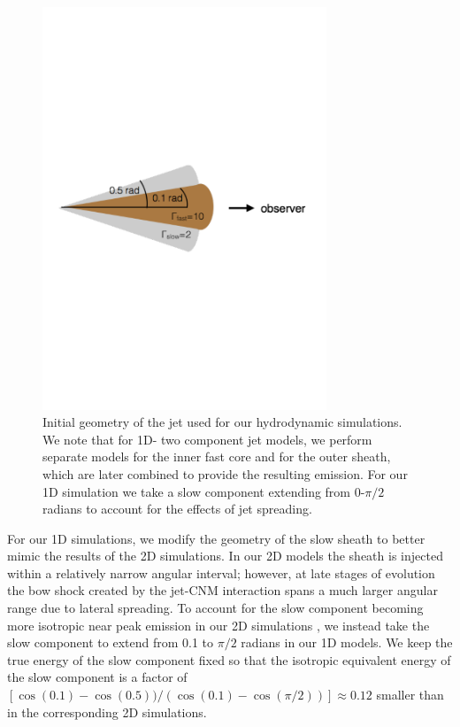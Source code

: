 \documentclass[usenatbib,fleqn]{mnras}
\begin{document}
\begin{figure}

\includegraphics[width=8.5cm]{jetstruct.pdf}
\caption{\label{fig:jetstruct} Initial geometry of the jet used for
  our hydrodynamic simulations. We note that for 1D- two component jet
  models, we perform separate models for the inner fast core and for
  the outer sheath, which are later combined to provide the resulting
  emission. For our 1D simulation we take a slow component
  extending from 0-$\pi/2$ radians to account for the effects of jet
  spreading.}
\end{figure}

For our 1D simulations, we modify the geometry of the slow sheath to
better mimic the results of the 2D simulations.  In our 2D models the
sheath is injected within a relatively narrow angular interval;
however, at late stages of evolution the bow shock created by the
jet-CNM interaction spans a much larger angular range due to lateral
spreading.  To account for the slow component becoming more isotropic
near peak emission in our 2D simulations \citep[bottom two panels of
Fig.~8 in][]{Mimica+2015}, we instead take the slow component to
extend from 0.1 to $\pi/2$ radians in our 1D models.  We keep the true
energy of the slow component fixed so that the isotropic equivalent
energy of the slow component is a factor of
$[\cos(0.1)-\cos(0.5))/(\cos(0.1)-\cos(\pi/2))]\approx 0.12$ smaller
than in the corresponding 2D simulations.
\end{document}
